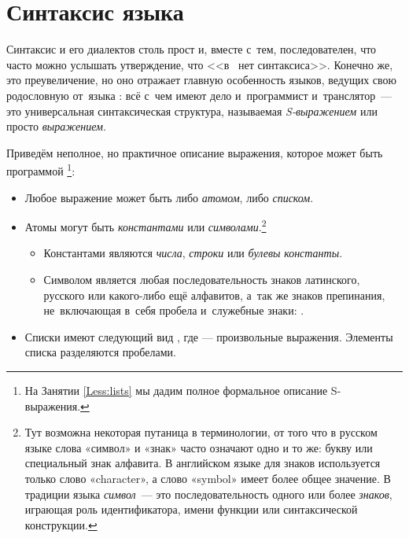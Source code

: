 
\label{Les:Scheme-programming}

\section{Синтаксис языка \Scheme}\label{Sec:expressions}%
%
Синтаксис  и его диалектов столь прост и, вместе с~тем, последователен, что часто можно услышать утверждение, что <<в~ нет синтаксиса>>. Конечно же, это преувеличение, но оно отражает главную особенность языков, ведущих свою родословную от~языка \Lisp: всё с~чем имеют дело и~программист и~транслятор~--- это универсальная синтаксическая структура, называемая \emph{S-выражением} или просто \emph{выражением}.{\par}

Приведём неполное, но практичное описание выражения, которое может быть программой \Scheme\footnote{На Занятии \ref{Less:lists} мы дадим полное формальное описание S-выражения.}:

\begin{itemize}[--]
 \item Любое выражение может быть либо \emph{атомом}, либо \emph{списком}. 
 \item {}Атомы могут быть \emph{константами} или \emph{символами}.\footnote{Тут возможна некоторая путаница в терминологии, от того что в русском языке слова «символ» и «знак» часто означают одно и то же: букву или специальный знак алфавита. В английском языке для знаков используется только слово «character», а слово «symbol» имеет более общее значение. В традиции языка \Lisp \emph{символ}~--- это последовательность одного или более \emph{знаков}, играющая роль идентификатора, имени функции или синтаксической конструкции.} 
\begin{itemize}[--]
 \item Константами являются \emph{числа}, \emph{строки} или \emph{булевы} \emph{константы}.
 \item\label{symbol}Символом является любая последовательность знаков латинского, русского или какого-либо ещё алфавитов, а~так же знаков препинания, не~включающая в~себя пробела и~служебные знаки: . 
\end{itemize}
 \item Списки имеют следующий вид , где  --- произвольные выражения. Элементы списка разделяются пробелами.
\end{itemize}

